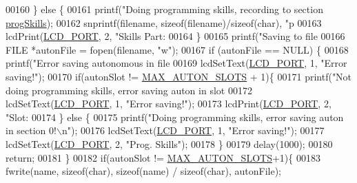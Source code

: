 \begin{DoxyCode}
{{{{{{{{{{00160     \} \textcolor{keywordflow}{else} \{
00161         printf(\textcolor{stringliteral}{"Doing programming skills, recording to section %
      \hyperlink{autonrecorder_8c_aa2eda471576bdbaf33835a71da9bc616}{progSkills});
00162         snprintf(filename, \textcolor{keyword}{sizeof}(filename)/\textcolor{keyword}{sizeof}(\textcolor{keywordtype}{char}), \textcolor{stringliteral}{"p%
00163         lcdPrint(\hyperlink{lcdmsg_8h_abcf42bd88b3c36193f301ca25b033875}{LCD\_PORT}, 2, \textcolor{stringliteral}{"Skills Part: %
00164     \}
00165     printf(\textcolor{stringliteral}{"Saving to file %
00166     FILE *autonFile = fopen(filename, \textcolor{stringliteral}{"w"});
00167     \textcolor{keywordflow}{if} (autonFile == NULL) \{
00168         printf(\textcolor{stringliteral}{"Error saving autonomous in file %
00169         lcdSetText(\hyperlink{lcdmsg_8h_abcf42bd88b3c36193f301ca25b033875}{LCD\_PORT}, 1, \textcolor{stringliteral}{"Error saving!"});
00170         \textcolor{keywordflow}{if}(autonSlot != \hyperlink{autonrecorder_8h_a5173a11a545cb4020fdd139552dc15c1}{MAX\_AUTON\_SLOTS} + 1)\{
00171             printf(\textcolor{stringliteral}{"Not doing programming skills, error saving auton in slot %
00172             lcdSetText(\hyperlink{lcdmsg_8h_abcf42bd88b3c36193f301ca25b033875}{LCD\_PORT}, 1, \textcolor{stringliteral}{"Error saving!"});
00173             lcdPrint(\hyperlink{lcdmsg_8h_abcf42bd88b3c36193f301ca25b033875}{LCD\_PORT}, 2,   \textcolor{stringliteral}{"Slot: %
00174         \} \textcolor{keywordflow}{else} \{
00175             printf(\textcolor{stringliteral}{"Doing programming skills, error saving auton in section 0!\(\backslash\)n"});
00176             lcdSetText(\hyperlink{lcdmsg_8h_abcf42bd88b3c36193f301ca25b033875}{LCD\_PORT}, 1, \textcolor{stringliteral}{"Error saving!"});
00177             lcdSetText(\hyperlink{lcdmsg_8h_abcf42bd88b3c36193f301ca25b033875}{LCD\_PORT}, 2, \textcolor{stringliteral}{"Prog. Skills"});
00178         \}
00179         delay(1000);
00180         \textcolor{keywordflow}{return};
00181     \}
00182     \textcolor{keywordflow}{if}(autonSlot != \hyperlink{autonrecorder_8h_a5173a11a545cb4020fdd139552dc15c1}{MAX\_AUTON\_SLOTS}+1)\{
00183         fwrite(name, \textcolor{keyword}{sizeof}(\textcolor{keywordtype}{char}), \textcolor{keyword}{sizeof}(name) / \textcolor{keyword}{sizeof}(\textcolor{keywordtype}{char}), autonFile);
}}}}}}}}}}}}}}}}}
\end{DoxyCode}
